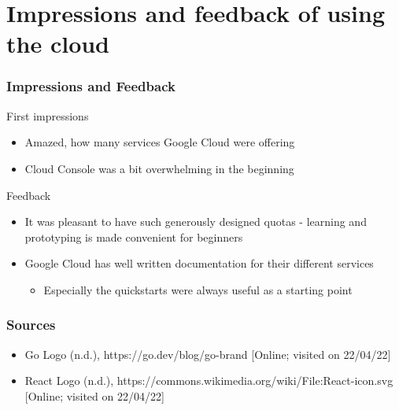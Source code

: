 \documentclass[aspectratio=169,16pt]{beamer}
\begin{document}
\section{Impressions and feedback of using the cloud}

\begin{frame}
    \frametitle{Impressions and Feedback}

    \begin{block}{\scriptsize First impressions}
        \begin{itemize} \scriptsize
            \item Amazed, how many services Google Cloud were offering
            \item Cloud Console was a bit overwhelming in the beginning
        \end{itemize}
    \end{block}

    \begin{block}{\scriptsize Feedback}
        \begin{itemize} \scriptsize
            \item It was pleasant to have such generously designed quotas - learning
                  and prototyping is made convenient for beginners
            \item Google Cloud has well written documentation for their different services
                  \begin{itemize}
                      \item Especially the quickstarts were always useful as a starting point
                  \end{itemize}
        \end{itemize}
    \end{block}
\end{frame}

\begin{frame}
    \frametitle{Sources}
    \begin{itemize} \tiny
        \item Go Logo (n.d.), https://go.dev/blog/go-brand [Online; visited on 22/04/22]
        \item React Logo (n.d.), https://commons.wikimedia.org/wiki/File:React-icon.svg [Online; visited on 22/04/22]
    \end{itemize}
\end{frame}
\end{document}
